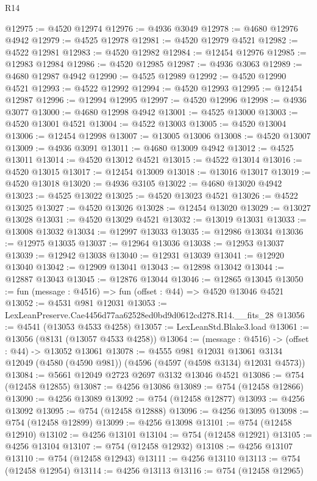 \begin{lexlean}{R14}
\begin{coremodule}
@12975 := @4520 @12974
@12976 := @4936 @3049
@12978 := @4680 @12976 @4942
@12979 := @4525 @12978
@12981 := @4520 @12979 @4521
@12982 := @4522 @12981
@12983 := @4520 @12982
@12984 := @12454 @12976
@12985 := @12983 @12984
@12986 := @4520 @12985
@12987 := @4936 @3063
@12989 := @4680 @12987 @4942
@12990 := @4525 @12989
@12992 := @4520 @12990 @4521
@12993 := @4522 @12992
@12994 := @4520 @12993
@12995 := @12454 @12987
@12996 := @12994 @12995
@12997 := @4520 @12996
@12998 := @4936 @3077
@13000 := @4680 @12998 @4942
@13001 := @4525 @13000
@13003 := @4520 @13001 @4521
@13004 := @4522 @13003
@13005 := @4520 @13004
@13006 := @12454 @12998
@13007 := @13005 @13006
@13008 := @4520 @13007
@13009 := @4936 @3091
@13011 := @4680 @13009 @4942
@13012 := @4525 @13011
@13014 := @4520 @13012 @4521
@13015 := @4522 @13014
@13016 := @4520 @13015
@13017 := @12454 @13009
@13018 := @13016 @13017
@13019 := @4520 @13018
@13020 := @4936 @3105
@13022 := @4680 @13020 @4942
@13023 := @4525 @13022
@13025 := @4520 @13023 @4521
@13026 := @4522 @13025
@13027 := @4520 @13026
@13028 := @12454 @13020
@13029 := @13027 @13028
@13031 := @4520 @13029 @4521
@13032 := @13019 @13031
@13033 := @13008 @13032
@13034 := @12997 @13033
@13035 := @12986 @13034
@13036 := @12975 @13035
@13037 := @12964 @13036
@13038 := @12953 @13037
@13039 := @12942 @13038
@13040 := @12931 @13039
@13041 := @12920 @13040
@13042 := @12909 @13041
@13043 := @12898 @13042
@13044 := @12887 @13043
@13045 := @12876 @13044
@13046 := @12865 @13045
@13050 := fun (message : @4516) => fun (offset : @44) => @4520 @13046 @4521
@13052 := @4531 @981 @12031
@13053 := LexLeanPreserve.Cae4456d77aa62528ed0bd9d0612cd278.R14.__fits_28
@13056 := @4541 (@13053 @4533 @4258)
@13057 := LexLeanStd.Blake3.load
@13061 := @13056 (@8131 (@13057 @4533 @4258))
@13064 := (message : @4516) -> (offset : @44) -> @13052 @13061
@13078 := @4555
    @981
    @12031
    @13061
    @3134
    @12049
    (@4580 (@4590 @981))
    (@4596 (@4597 (@4598 @3134) @12031 @4573))
@13084 := @5661 @12049 @2723 @2697 @3132 @13046 @4521
@13086 := @754 (@12458 @12855)
@13087 := @4256 @13086
@13089 := @754 (@12458 @12866)
@13090 := @4256 @13089
@13092 := @754 (@12458 @12877)
@13093 := @4256 @13092
@13095 := @754 (@12458 @12888)
@13096 := @4256 @13095
@13098 := @754 (@12458 @12899)
@13099 := @4256 @13098
@13101 := @754 (@12458 @12910)
@13102 := @4256 @13101
@13104 := @754 (@12458 @12921)
@13105 := @4256 @13104
@13107 := @754 (@12458 @12932)
@13108 := @4256 @13107
@13110 := @754 (@12458 @12943)
@13111 := @4256 @13110
@13113 := @754 (@12458 @12954)
@13114 := @4256 @13113
@13116 := @754 (@12458 @12965)

\end{coremodule}
\end{lexlean}

